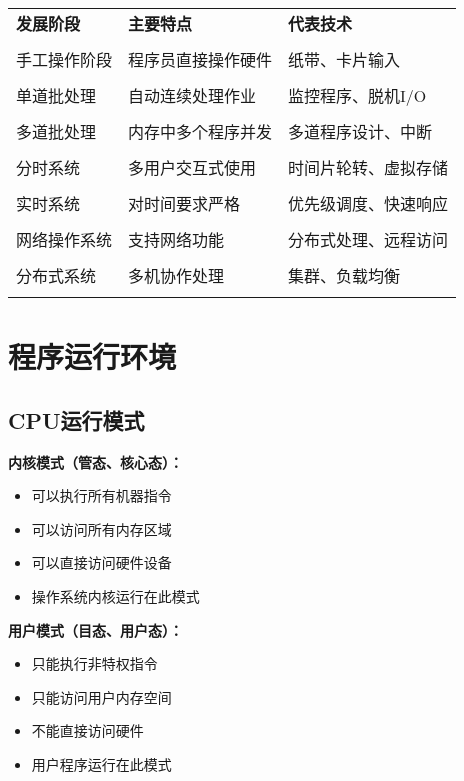 \documentclass[lang=cn,newtx,10pt,scheme=chinese]{../../elegantbook}
\begin{document}
\begin{longtable}{@{}p{3cm}p{4cm}p{6cm}@{}}
\toprule
\textbf{发展阶段} & \textbf{主要特点} & \textbf{代表技术} \\\\ \midrule
\endhead

手工操作阶段 & 程序员直接操作硬件 & 纸带、卡片输入 \\\\
单道批处理 & 自动连续处理作业 & 监控程序、脱机I/O \\\\
多道批处理 & 内存中多个程序并发 & 多道程序设计、中断 \\\\
分时系统 & 多用户交互式使用 & 时间片轮转、虚拟存储 \\\\
实时系统 & 对时间要求严格 & 优先级调度、快速响应 \\\\
网络操作系统 & 支持网络功能 & 分布式处理、远程访问 \\\\
分布式系统 & 多机协作处理 & 集群、负载均衡 \\\\

\bottomrule
\end{longtable}

\section{程序运行环境}

\subsection{CPU运行模式}

\textbf{内核模式（管态、核心态）：}
\begin{itemize}
  \item 可以执行所有机器指令
  \item 可以访问所有内存区域
  \item 可以直接访问硬件设备
  \item 操作系统内核运行在此模式
\end{itemize}

\textbf{用户模式（目态、用户态）：}
\begin{itemize}
  \item 只能执行非特权指令
  \item 只能访问用户内存空间
  \item 不能直接访问硬件
  \item 用户程序运行在此模式
\end{itemize}
\end{document}
